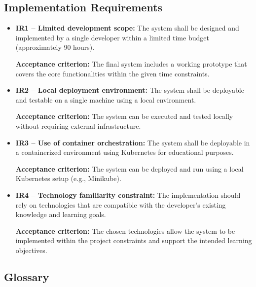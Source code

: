 \documentclass{scrartcl}
\begin{document}
\subsection{Implementation Requirements}

\begin{itemize}
	\item \textbf{IR1 -- Limited development scope:} The system shall be designed and implemented by a single developer within a limited time budget (approximately 90 hours).
	
	\textbf{Acceptance criterion:} The final system includes a working prototype that covers the core functionalities within the given time constraints.
	
	\item \textbf{IR2 -- Local deployment environment:} The system shall be deployable and testable on a single machine using a local environment.
	
	\textbf{Acceptance criterion:} The system can be executed and tested locally without requiring external infrastructure.
	
	\item \textbf{IR3 -- Use of container orchestration:} The system shall be deployable in a containerized environment using Kubernetes for educational purposes.
	
	\textbf{Acceptance criterion:} The system can be deployed and run using a local Kubernetes setup (e.g., Minikube).
	
	\item \textbf{IR4 -- Technology familiarity constraint:} The implementation should rely on technologies that are compatible with the developer’s existing knowledge and learning goals.
	
	\textbf{Acceptance criterion:} The chosen technologies allow the system to be implemented within the project constraints and support the intended learning objectives.
\end{itemize}

\subsection{Glossary}
\end{document}
